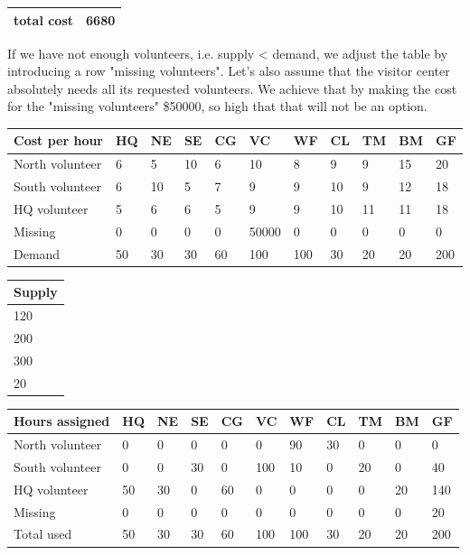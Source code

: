 \begin{center}
\begin{tabular}{|l|l|}
\hline
total cost & 6680 \\
\hline
\end{tabular}
\end{center}

If we have not enough volunteers, i.e. supply < demand, we adjust the table by introducing a row "missing volunteers". Let's also assume that the visitor center absolutely needs all its requested volunteers. We achieve that by making the cost for the "missing volunteers" \$50000, so high that that will not be an option.

\begin{center}
\begin{tabular}{|l|l|l|l|l|l|l|l|l|l|l|}
\hline
Cost per hour & HQ & NE & SE & CG & VC & WF & CL & TM & BM & GF \\
\hline
North volunteer & 6 & 5 & 10 & 6 & 10 & 8 & 9 & 9 & 15 & 20 \\
\hline
South volunteer & 6 & 10 & 5 & 7 & 9 & 9 & 10 & 9 & 12 & 18 \\
\hline
HQ volunteer & 5 & 6 & 6 & 5 & 9 & 9 & 10 & 11 & 11 & 18 \\
\hline
Missing & 0 & 0 & 0 & 0 & 50000 & 0 & 0 & 0 & 0 & 0 \\
\hline
Demand & 50 & 30 & 30 & 60 & 100 & 100 & 30 & 20 & 20 & 200 \\
\hline
\end{tabular}
\end{center}

\begin{center}
\begin{tabular}{|l|}
\hline
Supply \\
\hline
120 \\
\hline
200 \\
\hline
300 \\
\hline
20 \\
\hline
\end{tabular}
\end{center}

\begin{center}
\begin{tabular}{|l|l|l|l|l|l|l|l|l|l|l|}
\hline
Hours assigned & HQ & NE & SE & CG & VC & WF & CL & TM & BM & GF \\
\hline
North volunteer & 0 & 0 & 0 & 0 & 0 & 90 & 30 & 0 & 0 & 0 \\
\hline
South volunteer & 0 & 0 & 30 & 0 & 100 & 10 & 0 & 20 & 0 & 40 \\
\hline
HQ volunteer & 50 & 30 & 0 & 60 & 0 & 0 & 0 & 0 & 20 & 140 \\
\hline
Missing & 0 & 0 & 0 & 0 & 0 & 0 & 0 & 0 & 0 & 20 \\
\hline
Total used & 50 & 30 & 30 & 60 & 100 & 100 & 30 & 20 & 20 & 200 \\
\hline
\end{tabular}
\end{center}

